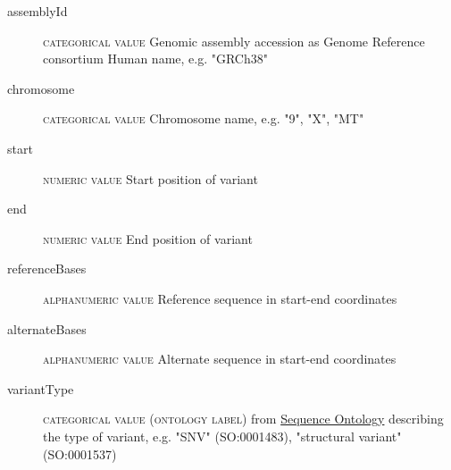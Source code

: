 \documentclass[a4paper, 10pt]{article}        %
\begin{document}
\begin{description}
	\item[assemblyId] {\textsc{categorical value}} Genomic assembly accession as Genome Reference consortium Human name, e.g. "GRCh38" %
\item[chromosome] {\textsc{categorical value}} Chromosome name, e.g. "9", "X", "MT"
	\item[start] {\textsc{numeric value}} Start position of variant
	\item[end] {\textsc{numeric value}} End position of variant %
	\item[referenceBases] {\textsc{alphanumeric value}} Reference sequence in start-end coordinates
	\item[alternateBases] {\textsc{alphanumeric value}} Alternate sequence in start-end coordinates
	\item[variantType] {\textsc{categorical value (ontology label)}} from \href{http://www.sequenceontology.org}{Sequence Ontology} describing the type of variant, e.g. "SNV" (SO:0001483), "structural variant"  (SO:0001537) %
 \end{description}
 

\end{document}
